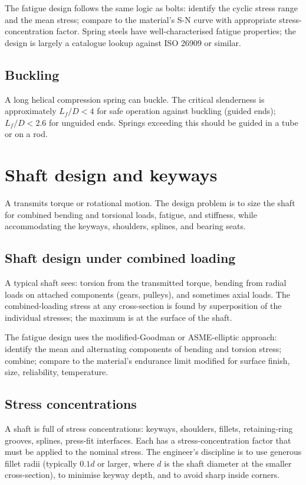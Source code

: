 The fatigue design follows the same logic as bolts: identify the cyclic stress range and the mean stress; compare to the material's S-N curve with appropriate stress-concentration factor. Spring steels have well-characterised fatigue properties; the design is largely a catalogue lookup against ISO 26909 or similar.

\subsection{Buckling}

A long helical compression spring can buckle. The critical slenderness is approximately $L_f / D < 4$ for safe operation against buckling (guided ends); $L_f / D < 2.6$ for unguided ends. Springs exceeding this should be guided in a tube or on a rod.

\section{Shaft design and keyways}

A  transmits torque or rotational motion. The design problem is to size the shaft for combined bending and torsional loads, fatigue, and stiffness, while accommodating the keyways, shoulders, splines, and bearing seats.

\subsection{Shaft design under combined loading}

A typical shaft sees: torsion from the transmitted torque, bending from radial loads on attached components (gears, pulleys), and sometimes axial loads. The combined-loading stress at any cross-section is found by superposition of the individual stresses; the maximum is at the surface of the shaft.

The fatigue design uses the modified-Goodman or ASME-elliptic approach: identify the mean and alternating components of bending and torsion stress; combine; compare to the material's endurance limit modified for surface finish, size, reliability, temperature.

\subsection{Stress concentrations}

A shaft is full of stress concentrations: keyways, shoulders, fillets, retaining-ring grooves, splines, press-fit interfaces. Each has a stress-concentration factor that must be applied to the nominal stress. The engineer's discipline is to use generous fillet radii (typically $0.1 d$ or larger, where $d$ is the shaft diameter at the smaller cross-section), to minimise keyway depth, and to avoid sharp inside corners.

